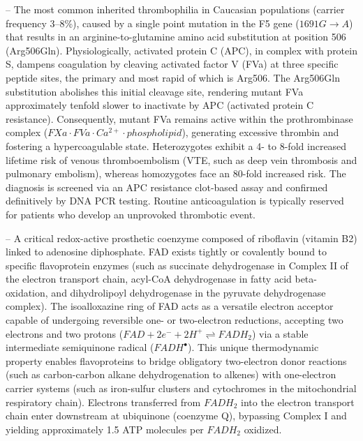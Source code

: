 -- The most common inherited thrombophilia in Caucasian populations (carrier frequency 3--8\%), caused by a single point mutation in the F5 gene ($1691G \to A$) that results in an arginine-to-glutamine amino acid substitution at position 506 (Arg506Gln). Physiologically, activated protein C (APC), in complex with protein S, dampens coagulation by cleaving activated factor V (FVa) at three specific peptide sites, the primary and most rapid of which is Arg506. The Arg506Gln substitution abolishes this initial cleavage site, rendering mutant FVa approximately tenfold slower to inactivate by APC (activated protein C resistance). Consequently, mutant FVa remains active within the prothrombinase complex ($FXa \cdot FVa \cdot Ca^{2+} \cdot phospholipid$), generating excessive thrombin and fostering a hypercoagulable state. Heterozygotes exhibit a 4- to 8-fold increased lifetime risk of venous thromboembolism (VTE, such as deep vein thrombosis and pulmonary embolism), whereas homozygotes face an 80-fold increased risk. The diagnosis is screened via an APC resistance clot-based assay and confirmed definitively by DNA PCR testing. Routine anticoagulation is typically reserved for patients who develop an unprovoked thrombotic event.

-- A critical redox-active prosthetic coenzyme composed of riboflavin (vitamin B2) linked to adenosine diphosphate. FAD exists tightly or covalently bound to specific flavoprotein enzymes (such as succinate dehydrogenase in Complex II of the electron transport chain, acyl-CoA dehydrogenase in fatty acid beta-oxidation, and dihydrolipoyl dehydrogenase in the pyruvate dehydrogenase complex). The isoalloxazine ring of FAD acts as a versatile electron acceptor capable of undergoing reversible one- or two-electron reductions, accepting two electrons and two protons ($FAD + 2e^- + 2H^+ \rightleftharpoons FADH_2$) via a stable intermediate semiquinone radical ($FADH^\bullet$). This unique thermodynamic property enables flavoproteins to bridge obligatory two-electron donor reactions (such as carbon-carbon alkane dehydrogenation to alkenes) with one-electron carrier systems (such as iron-sulfur clusters and cytochromes in the mitochondrial respiratory chain). Electrons transferred from $FADH_2$ into the electron transport chain enter downstream at ubiquinone (coenzyme Q), bypassing Complex I and yielding approximately 1.5 ATP molecules per $FADH_2$ oxidized.

